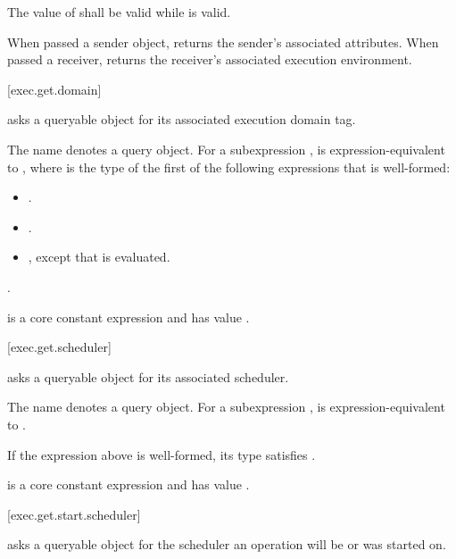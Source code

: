 \pnum
The value of  shall be valid while  is valid.

\pnum
\begin{note}
When passed a sender object,
 returns the sender's associated attributes.
When passed a receiver,
 returns the receiver's associated execution environment.
\end{note}

[exec.get.domain]{}

\pnum
{} asks a queryable object
for its associated execution domain tag.

\pnum
The name  denotes a query object.
For a subexpression ,
 is expression-equivalent to
,
where  is the type of the first
of the following expressions that is well-formed:
\begin{itemize}
\item {}.
\item {}.
\item {}, except that  is evaluated.
\end{itemize}.

\pnum
{} is
a core constant expression and has value .

[exec.get.scheduler]{}

\pnum
{} asks a queryable object for its associated scheduler.

\pnum
The name  denotes a query object.
For a subexpression ,
 is expression-equivalent to
.

\mandates
If the expression above is well-formed,
its type satisfies .

\pnum
{} is
a core constant expression and has value .

[exec.get.start.scheduler]{}

\pnum
{} asks a queryable object
for the scheduler an operation will be or was started on.

